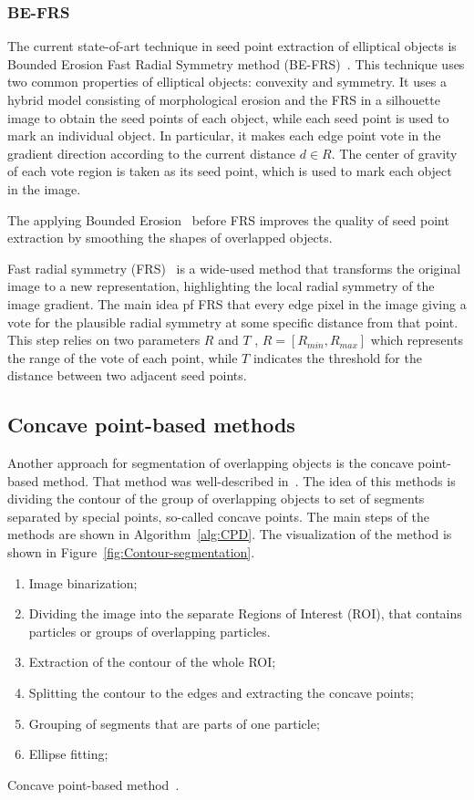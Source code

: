\documentclass{lutmscthesis}[2010/09/22]
\begin{document}
\subsubsection{BE-FRS}
The current state-of-art technique in seed point extraction of elliptical objects is Bounded Erosion Fast
Radial Symmetry method (BE-FRS)~\cite{BE-FRS}. This technique uses two common properties of elliptical objects: convexity and symmetry.
It uses a hybrid model consisting of morphological erosion and the FRS in a
silhouette image to obtain the seed points of each object, while each seed point
is used to mark an individual object. In particular, it makes each edge point vote
in the gradient direction according to the current distance $d \in R$. The center
of gravity of each vote region is taken as its seed point, which is used to mark
each object in the image. 

The applying Bounded Erosion~\cite{BE} before FRS improves the quality of seed point extraction by smoothing the shapes of overlapped objects.

Fast radial symmetry (FRS)~\cite{FRS}  is a wide-used method that transforms the original
image to a new representation, highlighting the local radial symmetry of the image gradient.
The main idea pf FRS that  every edge pixel in the image giving a vote for the plausible radial symmetry at some specific distance from that point. This step relies on two parameters $R$ and $T$ , $R = [R_{min} , R_{max}]$ which represents the range of the vote of each point, while $T$ indicates the threshold for the distance between two adjacent seed points. 

\subsection{Concave point-based methods}
Another approach for segmentation of overlapping objects is the concave point-based method. That method was well-described in~\cite{compare-cpd}. The idea of this methods is dividing the contour of the group of overlapping objects to set of segments separated by special points, so-called concave points. The main steps of the methods are shown in Algorithm~\ref{alg:CPD}. The visualization of the method is shown in Figure~\ref{fig:Contour-segmentation}.

\begin{algorithm} [H]
    \begin{enumerate}
        \item Image binarization;
        \item Dividing the image into the separate Regions of Interest (ROI), that contains particles or groups of overlapping particles.
        \item Extraction of the contour of the whole ROI;
        \item Splitting the contour to the edges and extracting the concave points;
        \item Grouping of segments that are parts of one particle;
        \item Ellipse fitting;
    \end{enumerate}
    \caption{Concave point-based method~\cite{Saddik}.}\label{alg:CPD}
\end{algorithm}
\end{document}
